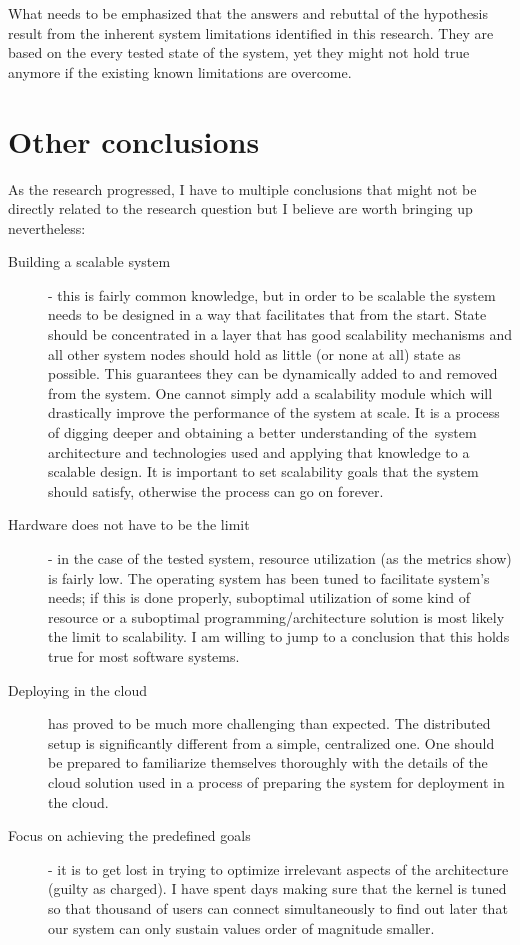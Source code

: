 \documentclass{uvamscse}
\begin{document}
What needs to be emphasized that the answers and rebuttal of the hypothesis result from the inherent system limitations identified in this research. They are based on the every tested state of the system, yet they might not hold true anymore if the existing known limitations are overcome.

\section{Other conclusions}
As the research progressed, I have to multiple conclusions that might not be directly related to the research question but I believe are worth bringing up nevertheless:
\begin{description}
  \item[Building a scalable system] - this is fairly common knowledge, but in order to be scalable the system needs to be designed in a way that facilitates that from the start. State should be concentrated in a layer that has good scalability mechanisms and all other system nodes should hold as little (or none at all) state as possible. This guarantees they can be dynamically added to and removed from the system. One cannot simply add a scalability module which will drastically improve the performance of the system at scale. It is a process of digging deeper and obtaining a better understanding of the system architecture and technologies used and applying that knowledge to a scalable design. It is important to set scalability goals that the system should satisfy, otherwise the process can go on forever.
  \item[Hardware does not have to be the limit] - in the case of the tested system, resource utilization (as the metrics show) is fairly low. The operating system has been tuned to facilitate system's needs; if this is done properly, suboptimal utilization of some kind of resource or a suboptimal programming/architecture solution is most likely the limit to scalability. I am willing to jump to a conclusion that this holds true for most software systems.
  \item[Deploying in the cloud] has proved to be much more challenging than expected. The distributed setup is significantly different from a simple, centralized one. One should be prepared to familiarize themselves thoroughly with the details of the cloud solution used in a process of preparing the system for deployment in the cloud.
  \item[Focus on achieving the predefined goals] - it is to get lost in trying to optimize irrelevant aspects of the architecture (guilty as charged). I have spent days making sure that the kernel is tuned so that thousand of users can connect simultaneously to find out later that our system can only sustain values order of magnitude smaller.

\end{description}
\end{document}
